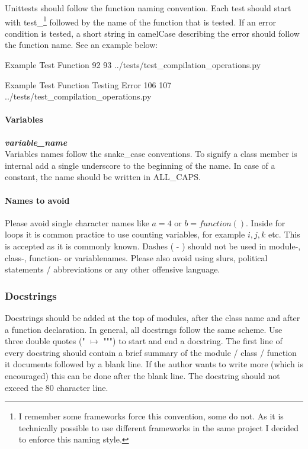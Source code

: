 Unittests should follow the function naming convention. Each test should start
with {\glqq test\_\grqq}\footnote{I remember some frameworks force this convention, 
some do not. As it is technically possible to use different frameworks in the same
project I decided to enforce this naming style.} followed by the name of the
function that is tested. If an error condition is tested, a short string in
camelCase describing the error should follow the function name. See an example
below:

\codeexample
{Example Test Function}
{92}
{93}
{../tests/test_compilation_operations.py}

\codeexample
{Example Test Function Testing Error}
{106}
{107}
{../tests/test_compilation_operations.py}

\paragraph{Variables} \textbf{\textit{variable\_name}} \\
Variables names follow the snake\_case conventions. To signify a class member
is internal add a single underscore to the beginning of the name. In case of
a constant, the name should be written in ALL\_CAPS.

\paragraph{Names to avoid} 
Please avoid single character names like $a = 4$ or $b = function()$. Inside
for loops it is common practice to use counting variables, for example $i, j,
k$ etc. This is accepted as it is commonly known. Dashes ( - ) should not be
used in module-, class-, function- or variablenames. Please also avoid using
slurs, political statements / abbreviations or any other offensive language.

\subsubsection{Docstrings}\label{ssub:docstrings}
Docstrings should be added at the top of modules, after the class name and
after a function declaration. In general, all docstrngs follow the same scheme.
Use three double quotes (" $\mapsto$ """) to start and end a docstring. 
The first line of every docstring should contain a brief summary of the module /
class / function it documents followed by a blank line. If the author wants to
write more (which is encouraged) this can be done after the blank line.
The docstring should not exceed the 80 character line.

